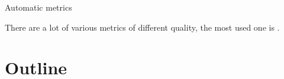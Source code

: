 Automatic metrics 


There are a lot of various metrics of different quality, the most
used one is  .


\section{Outline}





\begin{comment}
Machine Translation quality can be measured in two different ways: using human
evaluation or automatic metrics.  Altough human evaluation is considered more
accurate than automatic evaluation, it suffers some disadvantages.  It is slow
and expensive and therefore cannot be used in tuning parameters of statistical
models.

The aim of this thesis is to develop a new semi-automatic evaluation measure,
which would have advantages of both human evaluation and automatic evaluation.
The idea is to evaluate small sentence segments by human and create a database
of such annotation which could be used later to automatically evaluate new
unseen sentences.  This new measure should evaluate MT outputs more similarly
to how human do and still be cheap and fast after the initial database of
annotations is created once. It could be therefore used in tuning parameters of
MT systems.

The important part of the thesis is to design and develop a new annotation
environment which will be used to collect the annotations. This will be then used
to annotate wmt14 test data. The new measure will be analysed and compared to
current manual and automatic evaluation measures. 
\end{comment}





